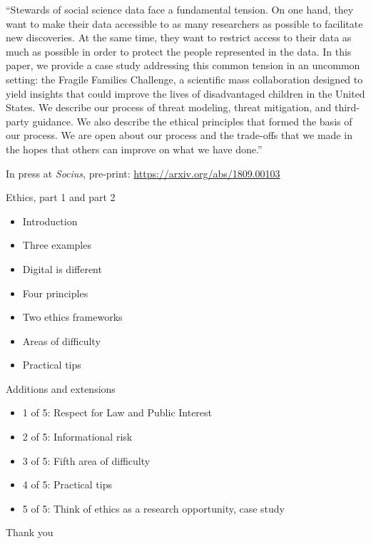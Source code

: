 \documentclass{beamer}
\begin{document}
\begin{frame}

``Stewards of social science data face a fundamental tension. On one hand, they want to make their data accessible to as many researchers as possible to facilitate new discoveries. At the same time, they want to restrict access to their data as much as possible in order to protect the people represented in the data. In this paper, we provide a case study addressing this common tension in an uncommon setting: the Fragile Families Challenge, a scientific mass collaboration designed to yield insights that could improve the lives of disadvantaged children in the United States. We describe our process of threat modeling, threat mitigation, and third-party guidance. We also describe the ethical principles that formed the basis of our process. We are open about our process and the trade-offs that we made in the hopes that others can improve on what we have done.''

\vfill
In press at \textit{Socius}, pre-print: \url{https://arxiv.org/abs/1809.00103}
\end{frame}
\begin{frame}

Ethics, part 1 and part 2
\begin{itemize}
\item Introduction
\item Three examples
\item Digital is different
\item Four principles
\item Two ethics frameworks
\item Areas of difficulty
\item Practical tips
\end{itemize}

\end{frame}
\begin{frame}

Additions and extensions
\begin{itemize}
\item 1 of 5: Respect for Law and Public Interest
\item 2 of 5: Informational risk
\item 3 of 5: Fifth area of difficulty
\item 4 of 5: Practical tips
\item 5 of 5: Think of ethics as a research opportunity, case study
\end{itemize}

\end{frame}
\begin{frame}

\begin{center}
\Large Thank you
\end{center}

\end{frame}
\end{document}
